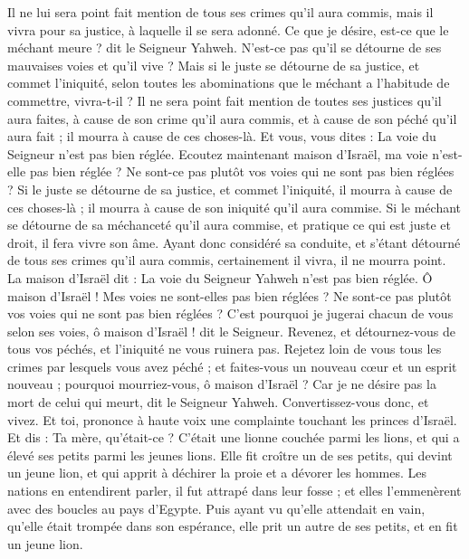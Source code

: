 \begin{multicols}{2}
Il ne lui sera point fait mention de tous ses crimes qu'il aura commis, mais il vivra pour sa justice, à laquelle il se sera adonné.
Ce que je désire, est-ce que le méchant meure ? dit le Seigneur Yahweh. N’est-ce pas qu'il se détourne de ses mauvaises voies et qu'il vive ?
Mais si le juste se détourne de sa justice, et commet l'iniquité, selon toutes les abominations que le méchant a l’habitude de commettre, vivra-t-il ? Il ne sera point fait mention de toutes ses justices qu'il aura faites, à cause de son crime qu'il aura commis, et à cause de son péché qu'il aura fait ; il mourra à cause de ces choses-là.
Et vous, vous dites : La voie du Seigneur n'est pas bien réglée. Ecoutez maintenant maison d'Israël, ma voie n'est-elle pas bien réglée ? Ne sont-ce pas plutôt vos voies qui ne sont pas bien réglées ?
Si le juste se détourne de sa justice, et commet l'iniquité, il mourra à cause de ces choses-là ; il mourra à cause de son iniquité qu'il aura commise.
Si le méchant se détourne de sa méchanceté qu'il aura commise, et pratique ce qui est juste et droit, il fera vivre son âme.
Ayant donc considéré sa conduite, et s'étant détourné de tous ses crimes qu'il aura commis, certainement il vivra, il ne mourra point.
La maison d'Israël dit : La voie du Seigneur Yahweh n'est pas bien réglée. Ô maison d'Israël ! Mes voies ne sont-elles pas bien réglées ? Ne sont-ce pas plutôt vos voies qui ne sont pas bien réglées ?
C'est pourquoi je jugerai chacun de vous selon ses voies, ô maison d'Israël ! dit le Seigneur. Revenez, et détournez-vous de tous vos péchés, et l'iniquité ne vous ruinera pas.
Rejetez loin de vous tous les crimes par lesquels vous avez péché ; et faites-vous un nouveau cœur et un esprit nouveau ; pourquoi mourriez-vous, ô maison d'Israël ?
Car je ne désire pas la mort de celui qui meurt, dit le Seigneur Yahweh. Convertissez-vous donc, et vivez.
\VerseOne{}Et toi, prononce à haute voix une complainte touchant les princes d'Israël.
Et dis : Ta mère, qu'était-ce ? C'était une lionne couchée parmi les lions, et qui a élevé ses petits parmi les jeunes lions.
Elle fit croître un de ses petits, qui devint un jeune lion, et qui apprit  à déchirer la proie et a dévorer les hommes.
Les nations en entendirent parler, il fut attrapé dans leur fosse ; et elles l’emmenèrent avec des boucles au pays d'Egypte.
Puis ayant vu qu'elle attendait en vain, qu’elle était trompée dans son espérance, elle prit un autre de ses petits, et en fit un jeune lion.

\end{multicols}
